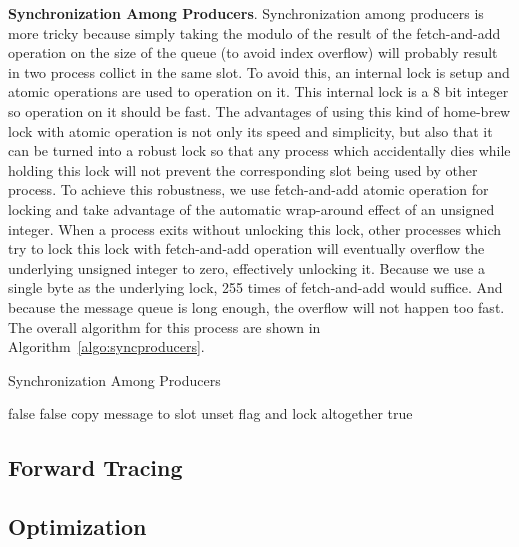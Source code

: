 \documentclass[letterpaper,twocolumn,10pt]{article}
\begin{document}
\noindent
\textbf{Synchronization Among Producers}. Synchronization among producers is
more tricky because simply taking the modulo of the result of the
fetch-and-add operation on the size of the queue (to avoid index overflow)
will probably result in two process collict in the same slot. To avoid this,
an internal lock is setup and atomic operations are used to operation on it.
This internal lock is a 8 bit integer so operation on it should be fast. The
advantages of using this kind of home-brew lock with atomic operation is not
only its speed and simplicity, but also that it can be turned into a robust
lock so that any process which accidentally dies while holding this lock will
not prevent the corresponding slot being used by other process. To achieve
this robustness, we use fetch-and-add atomic operation for locking and take
advantage of the automatic wrap-around effect of an unsigned integer. When a
process exits without unlocking this lock, other processes which try to lock
this lock with fetch-and-add operation will eventually overflow the
underlying unsigned integer to zero, effectively unlocking it. Because we use
a single byte as the underlying lock, 255 times of fetch-and-add would
suffice. And because the message queue is long enough, the overflow will not
happen too fast. The overall algorithm for this process are shown in
Algorithm~\ref{algo:syncproducers}.

\let\oldReturn\Return
\renewcommand{\Return}{\State\oldReturn}
\begin{algorithm}
\caption{Synchronization Among Producers}\label{algo:syncproducers}
\begin{algorithmic}[1]     %
     \Return false \EndIf
     \Return false \EndIf
    \State copy message to slot
    \State unset flag and lock altogether
    \Return true
\EndProcedure
\end{algorithmic}
\end{algorithm}


\subsection{Forward Tracing} \label{sec:fwtracing}

\subsection{Optimization} \label{sec:optm}
\end{document}
